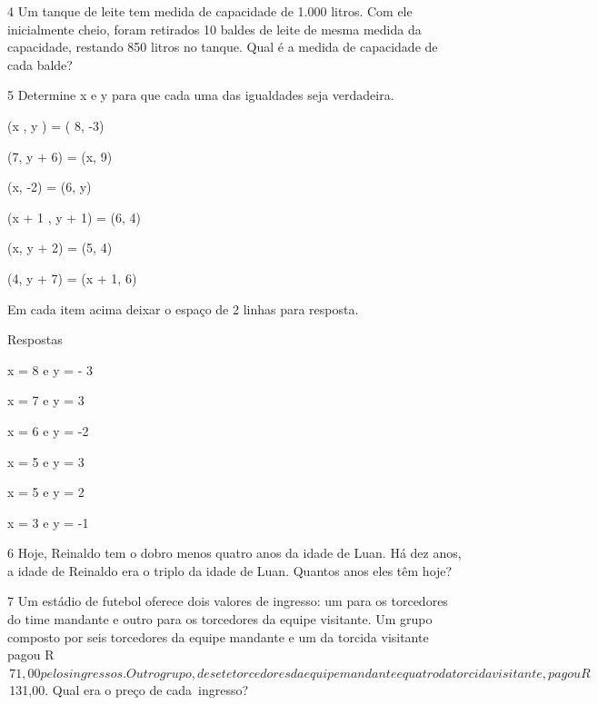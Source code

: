 {

\num{4} Um tanque de leite tem medida de capacidade de 1.000 litros. Com ele
inicialmente cheio, foram retirados 10 baldes de leite de mesma medida
da capacidade, restando 850 litros no tanque. Qual é a medida de
capacidade de cada balde?


\num{5} Determine x e y para que cada uma das igualdades seja verdadeira.
\item (x , y ) = ( 8, -3)
\item (7, y + 6) = (x, 9)
\item (x, -2) = (6, y)
\item (x + 1 , y + 1) = (6, 4)
\item (x, y + 2) = (5, 4)
\item (4, y + 7) = (x + 1, 6)

Em cada item acima deixar o espaço de 2 linhas para resposta.

Respostas
\item x = 8 e y = - 3
\item x = 7 e y = 3
\item x = 6 e y = -2
\item x = 5 e y = 3
\item x = 5 e y = 2
\item x = 3 e y = -1

\num{6} Hoje, Reinaldo tem o dobro menos quatro anos da idade de Luan. Há dez
anos, a idade de Reinaldo era o triplo da idade de Luan. Quantos anos
eles têm hoje?


\num{7} Um estádio de futebol oferece dois valores de ingresso: um para os
torcedores do time mandante e outro para os torcedores da equipe visitante. Um
grupo composto por seis torcedores da equipe mandante e um da torcida
visitante pagou R$\,71,00 pelos ingressos. Outro grupo, de sete torcedores da
equipe mandante e quatro da torcida visitante, pagou R$\,131,00. Qual era o
preço de cada~ingresso?

}
